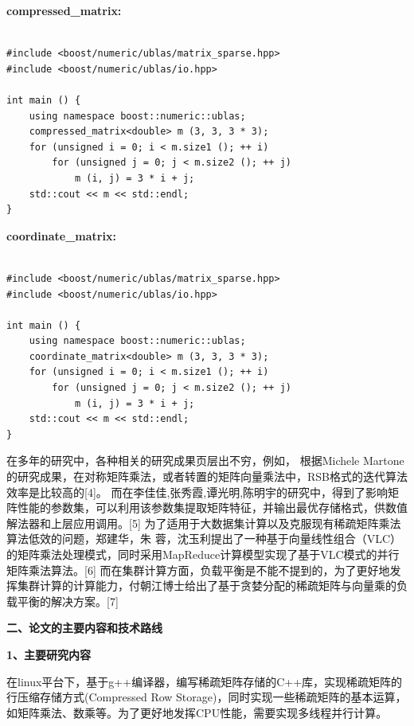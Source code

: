 \documentclass{article}
\begin{document}
\textbf{compressed\_matrix:}
\begin{lstlisting}

#include <boost/numeric/ublas/matrix_sparse.hpp>
#include <boost/numeric/ublas/io.hpp>

int main () {
    using namespace boost::numeric::ublas;
    compressed_matrix<double> m (3, 3, 3 * 3);
    for (unsigned i = 0; i < m.size1 (); ++ i)
        for (unsigned j = 0; j < m.size2 (); ++ j)
            m (i, j) = 3 * i + j;
    std::cout << m << std::endl;
}

\end{lstlisting}

\textbf{coordinate\_matrix:}
\begin{lstlisting}

#include <boost/numeric/ublas/matrix_sparse.hpp>
#include <boost/numeric/ublas/io.hpp>

int main () {
    using namespace boost::numeric::ublas;
    coordinate_matrix<double> m (3, 3, 3 * 3);
    for (unsigned i = 0; i < m.size1 (); ++ i)
        for (unsigned j = 0; j < m.size2 (); ++ j)
            m (i, j) = 3 * i + j;
    std::cout << m << std::endl;
}
\end{lstlisting}


在多年的研究中，各种相关的研究成果页层出不穷，例如，
根据Michele Martone的研究成果，在对称矩阵乘法，或者转置的矩阵向量乘法中，RSB格式的迭代算法效率是比较高的[4]。
而在李佳佳,张秀霞,谭光明,陈明宇的研究中，得到了影响矩阵性能的参数集，可以利用该参数集提取矩阵特征，并输出最优存储格式，供数值解法器和上层应用调用。[5]
为了适用于大数据集计算以及克服现有稀疏矩阵乘法算法低效的问题，郑建华，朱 蓉，沈玉利提出了一种基于向量线性组合（VLC）的矩阵乘法处理模式，同时采用MapReduce计算模型实现了基于VLC模式的并行矩阵乘法算法。[6]
而在集群计算方面，负载平衡是不能不提到的，为了更好地发挥集群计算的计算能力，付朝江博士给出了基于贪婪分配的稀疏矩阵与向量乘的负载平衡的解决方案。[7]
\newline


\textbf{二、论文的主要内容和技术路线}
      \qquad
\newline

     \textbf{1、主要研究内容} \qquad
\newline
     
     在linux平台下，基于g++编译器，编写稀疏矩阵存储的C++库，实现稀疏矩阵的行压缩存储方式(Compressed Row Storage)，同时实现一些稀疏矩阵的基本运算，如矩阵乘法、数乘等。为了更好地发挥CPU性能，需要实现多线程并行计算。
\newline
\end{document}
